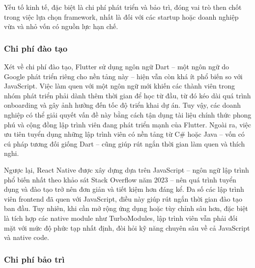 \begin{flushleft}
    \hspace*{0.8cm}Yếu tố kinh tế, đặc biệt là chi phí phát triển và bảo trì, đóng vai trò then chốt trong việc lựa chọn framework, nhất là đối với các startup hoặc doanh nghiệp vừa và nhỏ vốn có nguồn lực hạn chế.
\end{flushleft}

\subsubsection{Chi phí đào tạo}

\begin{flushleft}
    \hspace*{0.8cm}Xét về chi phí đào tạo, Flutter sử dụng ngôn ngữ Dart – một ngôn ngữ do Google phát triển riêng cho nền tảng này – hiện vẫn còn khá ít phổ biến so với JavaScript. Việc làm quen với một ngôn ngữ mới khiến các thành viên trong nhóm phát triển phải dành thêm thời gian để học từ đầu, từ đó kéo dài quá trình onboarding và gây ảnh hưởng đến tốc độ triển khai dự án. Tuy vậy, các doanh nghiệp có thể giải quyết vấn đề này bằng cách tận dụng tài liệu chính thức phong phú và cộng đồng lập trình viên đang phát triển mạnh của Flutter. Ngoài ra, việc ưu tiên tuyển dụng những lập trình viên có nền tảng từ C\# hoặc Java – vốn có cú pháp tương đối giống Dart – cũng giúp rút ngắn thời gian làm quen và thích nghi.

    \vspace{0.5em}

    \hspace*{1.5em}Ngược lại, React Native được xây dựng dựa trên JavaScript – ngôn ngữ lập trình phổ biến nhất theo khảo sát Stack Overflow năm 2023 – nên quá trình tuyển dụng và đào tạo trở nên đơn giản và tiết kiệm hơn đáng kể. Đa số các lập trình viên frontend đã quen với JavaScript, điều này giúp rút ngắn thời gian đào tạo ban đầu. Tuy nhiên, khi cần mở rộng ứng dụng hoặc tùy chỉnh sâu hơn, đặc biệt là tích hợp các native module như TurboModules, lập trình viên vẫn phải đối mặt với mức độ phức tạp nhất định, đòi hỏi kỹ năng chuyên sâu về cả JavaScript và native code.
\end{flushleft}

\subsubsection{Chi phí bảo trì}

